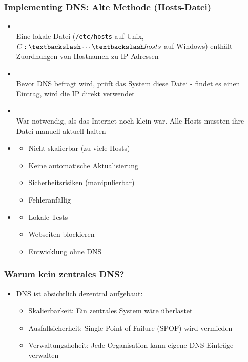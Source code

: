\subsubsection*{Implementing DNS: Alte Methode (Hosts-Datei)}
\begin{itemize}
    \item {}\\
    Eine lokale Datei (\texttt{/etc/hosts} auf Unix, \texttt{$C:\textbackslash \cdots \textbackslash hosts$} auf Windows) enthält Zuordnungen von Hostnamen zu IP-Adressen
    \item {}\\
    Bevor DNS befragt wird, prüft das System diese Datei - findet es einen Eintrag, wird die IP direkt verwendet
    \item {}\\
    War notwendig, als das Internet noch klein war. Alle Hosts mussten ihre Datei manuell aktuell halten
    \item {}
    \begin{itemize}
        \item Nicht skalierbar (zu viele Hosts)
        \item Keine automatische Aktualisierung
        \item Sicherheitsrisiken (manipulierbar)
        \item Fehleranfällig
    \end{itemize}
    \item {}
    \begin{itemize}
        \item Lokale Tests
        \item Webseiten blockieren
        \item Entwicklung ohne DNS
    \end{itemize}
\end{itemize}
\subsubsection*{Warum kein zentrales DNS?}
\begin{itemize}
    \item DNS ist absichtlich dezentral aufgebaut:
    \begin{itemize}
        \item Skalierbarkeit: Ein zentrales System wäre überlastet
        \item Ausfallsicherheit: Single Point of Failure (SPOF) wird vermieden
        \item Verwaltungshoheit: Jede Organisation kann eigene DNS-Einträge verwalten
    \end{itemize}
\end{itemize}
